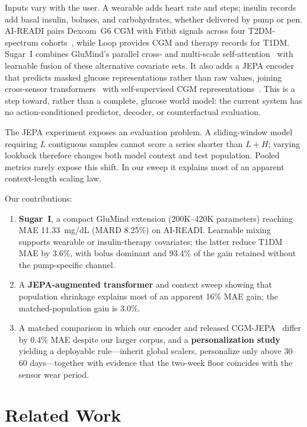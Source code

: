 \documentclass[11pt,a4paper]{article}
\begin{document}
Inputs vary with the user.
A wearable adds heart rate and steps; insulin records add basal insulin, boluses, and carbohydrates, whether delivered by pump or pen.
AI-READI pairs Dexcom~G6 CGM with Fitbit signals across four T2DM-spectrum cohorts~\citep{aireadi2024}, while Loop provides CGM and therapy records for T1DM.
Sugar~I combines GluMind's parallel cross- and multi-scale self-attention~\citep{farahmand2025glumind} with learnable fusion of these alternative covariate sets.
It also adds a JEPA encoder that predicts masked glucose representations rather than raw values, joining cross-sensor transformers~\citep{abbaspourazad2023biosignal} with self-supervised CGM representations~\citep{lutsker2024cgmfm}.
This is a step toward, rather than a complete, glucose world model: the current system has no action-conditioned predictor, decoder, or counterfactual evaluation.

The JEPA experiment exposes an evaluation problem.
A sliding-window model requiring $L$ contiguous samples cannot score a series shorter than $L + H$; varying lookback therefore changes both model context and test population.
Pooled metrics rarely expose this shift.
In our sweep it explains most of an apparent context-length scaling law.

Our contributions:

\begin{enumerate}
    \item \textbf{Sugar~I}, a compact GluMind extension (200K--420K parameters) reaching MAE 11.33~mg/dL (MARD 8.25\%) on AI-READI. Learnable mixing supports wearable or insulin-therapy covariates; the latter reduce T1DM MAE by 3.6\%, with bolus dominant and 93.4\% of the gain retained without the pump-specific channel.
    \item A \textbf{JEPA-augmented transformer} and context sweep showing that population shrinkage explains most of an apparent 16\% MAE gain; the matched-population gain is 3.0\%.
    \item A matched comparison in which our encoder and released CGM-JEPA~\citep{muhammad2026cgmjepa} differ by 0.4\% MAE despite our larger corpus, and a \textbf{personalization study} yielding a deployable rule---inherit global scalers, personalize only above 30--60 days---together with evidence that the two-week floor coincides with the sensor wear period.
\end{enumerate}

\section{Related Work}
\end{document}
